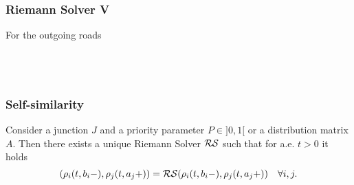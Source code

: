 
\begin{frame}[label=drawingO, fragile]
\frametitle{Riemann Solver V}
For the outgoing roads	
\begin{columns}
	\begin{figure}[ht]
\centering
{
\resizebox{.9\columnwidth}{!}{
}
\label{fig:I1}}
\end{figure}
	\begin{figure}[ht]
\centering
{
\resizebox{.9\columnwidth}{!}{
}
\label{fig:O2}}
\end{figure}
\end{columns}
\begin{flushright}
\hyperlink{Solution}{}
\end{flushright}	
	
\end{frame}

\begin{frame}[label=Theorem, fragile]
\frametitle{Self-similarity}
\begin{theorem}
	\label{th:existenceSolPiccoli}
	Consider a junction $J$ and a priority parameter $P\in ]0,1[$ or a distribution matrix $A$. Then there exists a unique Riemann Solver $\mathcal{RS}$ such that for a.e. $t>0$ it holds 
	$$(\rho_i(t,b_i-),\rho_j(t,a_j+))=\mathcal{RS}(\rho_i(t,b_i-),\rho_j(t,a_j+)) \quad \forall i,j .$$ 
\end{theorem}
\end{frame}

